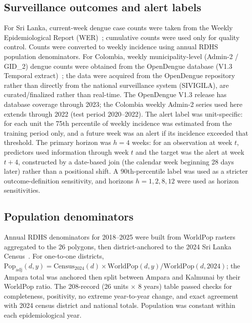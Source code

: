\documentclass[11pt,a4paper]{article}
\begin{document}
\subsection{Surveillance outcomes and alert labels}
For Sri Lanka, current-week dengue case counts were taken from the Weekly Epidemiological Report (WER)~\cite{SriLankaWER}; cumulative counts were used only for quality control. Counts were converted to weekly incidence using annual RDHS population denominators. For Colombia, weekly municipality-level (Admin-2 / GID\_2) dengue counts were obtained from the OpenDengue database (V1.3 Temporal extract)~\cite{Clarke2024OpenDengue,OpenDengue2024}; the data were acquired from the OpenDengue repository rather than directly from the national surveillance system (SIVIGILA), are curated/finalized rather than real-time. The OpenDengue V1.3 release has database coverage through 2023; the Colombia weekly Admin-2 series used here extends through 2022 (test period 2020--2022). The alert label was unit-specific: for each unit the 75th percentile of weekly incidence was estimated from the training period only, and a future week was an alert if its incidence exceeded that threshold. The primary horizon was $h=4$ weeks: for an observation at week $t$, predictors used information through week $t$ and the target was the alert at week $t+4$, constructed by a date-based join (the calendar week beginning 28 days later) rather than a positional shift. A 90th-percentile label was used as a stricter outcome-definition sensitivity, and horizons $h=1,2,8,12$ were used as horizon sensitivities.

\subsection{Population denominators}
Annual RDHS denominators for 2018--2025 were built from WorldPop rasters~\cite{Tatem2017,WorldPop2025} aggregated to the 26 polygons, then district-anchored to the 2024 Sri Lanka Census~\cite{SriLankaCensus2025}. For one-to-one districts, $\mathrm{Pop}_{\mathrm{adj}}(d,y)=\mathrm{Census}_{2024}(d)\times \mathrm{WorldPop}(d,y)/\mathrm{WorldPop}(d,2024)$; the Ampara total was anchored then split between Ampara and Kalmunai by their WorldPop ratio. The 208-record (26 units $\times$ 8 years) table passed checks for completeness, positivity, no extreme year-to-year change, and exact agreement with 2024 census district and national totals. Population was constant within each epidemiological year.
\end{document}
